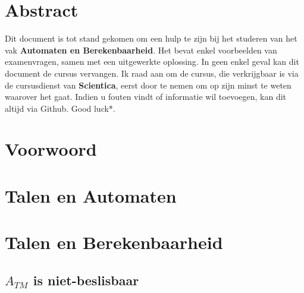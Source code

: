 \documentclass[
10pt,
a4paper,
oneside,
headinclude,footinclude, 
BCOR5mm,
]{scrartcl}
\title{\normalfont\spacedallcaps{Automata \& Computability}}
\author{\spacedlowsmallcaps{Jensen Bernard}}
\date{}
\begin{document}
\renewcommand{\sectionmark}[1]{\markright{\spacedlowsmallcaps{#1}}}
\lehead{\mbox{\llap{\small\thepage\kern1em\color{halfgray} \vline}\color{halfgray}\hspace{0.5em}\rightmark\hfil}}
\pagestyle{scrheadings}

\maketitle

\setcounter{tocdepth}{1} %

\tableofcontents

\section*{Abstract} 

Dit document is tot stand gekomen om een hulp te zijn bij het studeren van het vak \textbf{Automaten en Berekenbaarheid}. Het bevat enkel voorbeelden van examenvragen, samen met een uitgewerkte oplossing. In geen enkel geval kan dit document de cursus vervangen. Ik raad aan om de cursus, die verkrijgbaar is via de cursusdienst van \textbf{Scientica}, eerst door te nemen om op zijn minst te weten waarover het gaat. Indien u fouten vindt of informatie wil toevoegen, kan dit altijd via Github. Good luck*.

{\let\thefootnote\relax{}}

\newpage 

\section{Voorwoord}

\lipsum[1-3]

\section{Talen en Automaten}

\lipsum[5] 

\section{Talen en Berekenbaarheid}

\subsection{$A_{TM}$ is niet-beslisbaar}
\end{document}
